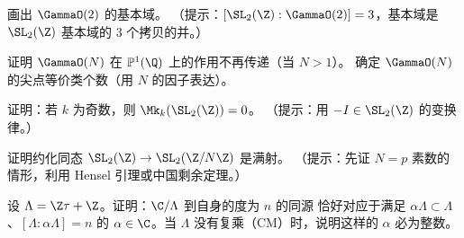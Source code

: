 \begin{exercise}
\label{ex:ch1-fund-domain}
画出 $\GammaO(2)$ 的基本域。
（提示：$[\SL_2(\Z) : \GammaO(2)] = 3$，基本域是 $\SL_2(\Z)$ 基本域的
$3$ 个拷贝的并。）
\end{exercise}

\begin{exercise}
\label{ex:ch1-cusps-gamma0}
证明 $\GammaO(N)$ 在 $\mathbb{P}^1(\Q)$ 上的作用不再传递（当 $N > 1$）。
确定 $\GammaO(N)$ 的尖点等价类个数（用 $N$ 的因子表达）。
\end{exercise}

\begin{exercise}
\label{ex:ch1-weight-k}
证明：若 $k$ 为奇数，则 $\Mk_k(\SL_2(\Z)) = 0$。
（提示：用 $-I \in \SL_2(\Z)$ 的变换律。）
\end{exercise}

\begin{exercise}
\label{ex:ch1-surjection}
证明约化同态 $\SL_2(\Z) \to \SL_2(\Z/N\Z)$ 是满射。
（提示：先证 $N = p$ 素数的情形，利用 Hensel 引理或中国剩余定理。）
\end{exercise}

\begin{exercise}
\label{ex:ch1-isogeny-degree}
设 $\Lambda = \Z\tau + \Z$。证明：$\C/\Lambda$ 到自身的度为 $n$ 的同源
恰好对应于满足 $\alpha\Lambda \subset \Lambda$、$[\Lambda : \alpha\Lambda] = n$
的 $\alpha \in \C$。当 $\Lambda$ 没有复乘（CM）时，说明这样的 $\alpha$ 必为整数。
\end{exercise}
